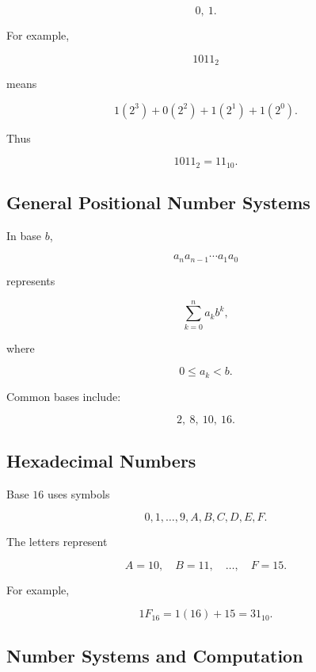 \[
\boxed{
0,\ 1.
}
\]

For example,

\[
\boxed{
1011_2
}
\]

means

\[
1(2^3)
+
0(2^2)
+
1(2^1)
+
1(2^0).
\]

Thus

\[
\boxed{
1011_2
=
11_{10}.
}
\]

\subsection{General Positional Number Systems}
\label{subsec:positional-number-systems}

In base \(b\),

\[
\boxed{
a_na_{n-1}\cdots a_1a_0
}
\]

represents

\[
\boxed{
\sum_{k=0}^{n}
a_kb^k,
}
\]

where

\[
0\leq a_k<b.
\]

Common bases include:

\[
\boxed{
2,\ 8,\ 10,\ 16.
}
\]

\subsection{Hexadecimal Numbers}
\label{subsec:hexadecimal-reference}

Base \(16\) uses symbols

\[
\boxed{
0,1,\ldots,9,A,B,C,D,E,F.
}
\]

The letters represent

\[
\boxed{
A=10,
\quad
B=11,
\quad
\ldots,
\quad
F=15.
}
\]

For example,

\[
\boxed{
1F_{16}
=
1(16)+15
=
31_{10}.
}
\]

\subsection{Number Systems and Computation}
\label{subsec:number-systems-computation}

